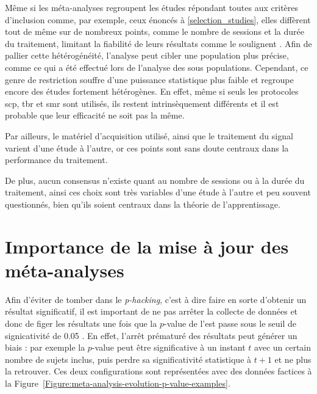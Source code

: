Même si les méta-analyses regroupent les études répondant toutes aux critères d'inclusion comme, par exemple, ceux énoncés à \ref{selection_studies}, 
elles diffèrent tout de même sur de nombreux points, comme le nombre de sessions et la durée du traitement, limitant la fiabilité de leurs résultats 
comme le soulignent \citet{Alkoby2017}. Afin de pallier 
cette hétérogénéité, l'analyse peut cibler une population plus précise, comme ce qui a été effectué lors de l'analyse
des sous populations. Cependant, ce genre de restriction souffre d'une puissance statistique plus faible et regroupe encore des études fortement hétérogènes.
En effet, même si seuls les protocoles \gls{scp}, \gls{tbr} et \gls{smr} sont utilisés, ils restent intrinsèquement différents et il est probable que leur
efficacité ne soit pas la même. 

Par ailleurs, le matériel d'acquisition utilisé, ainsi que le traitement du signal varient d'une étude à l'autre, or ces points sont sans doute centraux 
dans la performance du traitement. 

De plus, aucun consensus n'existe quant au nombre de sessions ou à la durée du traitement, ainsi ces choix sont très variables d'une étude à l'autre et peu
souvent questionnés, bien qu'ils soient centraux dans la théorie de l'apprentissage.

\section{Importance de la mise à jour des méta-analyses} \label{need_to_update_meta_analysis}

Afin d'éviter de tomber dans le \textit{p-hacking}, c'est à dire faire en sorte d'obtenir un résultat significatif, il est important de ne pas arrêter la collecte de données 
et donc de figer les résultats une fois que la $p$-value de l'\gls{est} passe sous le seuil de signicativité de 0.05 \citep{Head2015, Coffman2015}. En effet, l'arrêt prématuré des résultats peut
générer un biais : par exemple la $p$-value peut être significative à un instant $t$ avec un certain nombre de sujets inclus, puis perdre sa significativité statistique à
$t + 1$ et ne plus la retrouver. Ces deux configurations sont représentées avec des données factices à la Figure~\ref{Figure:meta-analysis-evolution-p-value-examples}.

